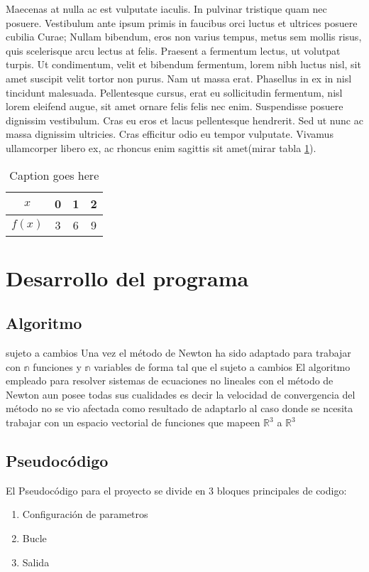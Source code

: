 \documentclass[11pt]{article}
\begin{document}
Maecenas at nulla ac est vulputate iaculis. In pulvinar tristique quam nec posuere. Vestibulum ante ipsum primis in faucibus orci luctus et ultrices posuere cubilia Curae; Nullam bibendum, eros non varius tempus, metus sem mollis risus, quis scelerisque arcu lectus at felis. Praesent a fermentum lectus, ut volutpat turpis. Ut condimentum, velit et bibendum fermentum, lorem nibh luctus nisl, sit amet suscipit velit tortor non purus. Nam ut massa erat. Phasellus in ex in nisl tincidunt malesuada. Pellentesque cursus, erat eu sollicitudin fermentum, nisl lorem eleifend augue, sit amet ornare felis felis nec enim. Suspendisse posuere dignissim vestibulum. Cras eu eros et lacus pellentesque hendrerit. Sed ut nunc ac massa dignissim ultricies. Cras efficitur odio eu tempor vulputate. Vivamus ullamcorper libero ex, ac rhoncus enim sagittis sit amet(mirar tabla \ref{tab:data1}).

\begin{table}[H]
	\centering
		\begin{tabular}{|c|c|c|c|}\hline
		$x$ &0&1&2\\ \hline
		$f(x)$ &3&6&9\\ \hline		
		\end{tabular}
	\caption{Caption goes here}
	\label{tab:data1}
\end{table}


\section{Desarrollo del programa}

\subsection{Algoritmo}
sujeto a cambios
Una vez el método de Newton ha sido adaptado para trabajar con $\mathbb{n}$ funciones y $\mathbb{n}$ variables de forma tal que el  
sujeto a cambios
El algoritmo empleado para resolver sistemas de ecuaciones no lineales con el método de Newton aun posee todas sus cualidades es decir la velocidad de convergencia del método no se vio afectada como resultado de adaptarlo al caso donde se ncesita trabajar con un espacio vectorial de funciones que mapeen $\mathbb{R}^3$ a $\mathbb{R}^3$


\subsection{Pseudocódigo}
El Pseudocódigo para el proyecto se divide en 3 bloques principales de codigo:
\begin{enumerate}
  \item Configuración de parametros
  \item Bucle
  \item Salida
\end{enumerate}
\end{document}
